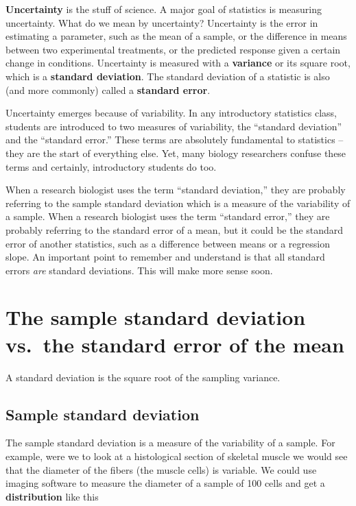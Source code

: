 \documentclass[]{book}
\begin{document}
\textbf{Uncertainty} is the stuff of science. A major goal of statistics is measuring uncertainty. What do we mean by uncertainty? Uncertainty is the error in estimating a parameter, such as the mean of a sample, or the difference in means between two experimental treatments, or the predicted response given a certain change in conditions. Uncertainty is measured with a \textbf{variance} or its square root, which is a \textbf{standard deviation}. The standard deviation of a statistic is also (and more commonly) called a \textbf{standard error}.

Uncertainty emerges because of variability. In any introductory statistics class, students are introduced to two measures of variability, the ``standard deviation'' and the ``standard error.'' These terms are absolutely fundamental to statistics -- they are the start of everything else. Yet, many biology researchers confuse these terms and certainly, introductory students do too.

When a research biologist uses the term ``standard deviation,'' they are probably referring to the sample standard deviation which is a measure of the variability of a sample. When a research biologist uses the term ``standard error,'' they are probably referring to the standard error of a mean, but it could be the standard error of another statistics, such as a difference between means or a regression slope. An important point to remember and understand is that all standard errors \emph{are} standard deviations. This will make more sense soon.

\hypertarget{the-sample-standard-deviation-vs.-the-standard-error-of-the-mean}{%
\section{The sample standard deviation vs.~the standard error of the mean}\label{the-sample-standard-deviation-vs.-the-standard-error-of-the-mean}}

A standard deviation is the square root of the sampling variance.

\hypertarget{sample-standard-deviation}{%
\subsection{Sample standard deviation}\label{sample-standard-deviation}}

The sample standard deviation is a measure of the variability of a sample. For example, were we to look at a histological section of skeletal muscle we would see that the diameter of the fibers (the muscle cells) is variable. We could use imaging software to measure the diameter of a sample of 100 cells and get a \textbf{distribution} like this
\end{document}

